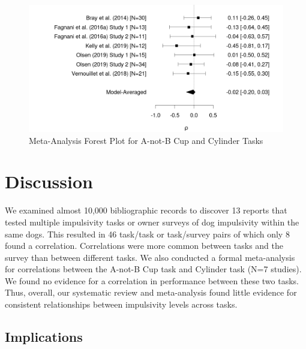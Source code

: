 \documentclass[
  ,pub,floatsintext]{apa6}
\begin{document}
\begin{figure}[h]
\caption{\newline Meta-Analysis Forest Plot for A-not-B Cup and Cylinder Tasks \label{fig:forest}}
\begin{center}
\includegraphics[width=0.8\linewidth]{"figures/anotb-cylinder-forestplot.png"}
\end{center}


\end{figure}

\hypertarget{discussion}{%
\section{Discussion}\label{discussion}}

We examined almost 10,000 bibliographic records to discover 13 reports that tested multiple impulsivity tasks or owner surveys of dog impulsivity within the same dogs. This resulted in 46 task/task or task/survey pairs of which only 8 found a correlation. Correlations were more common between tasks and the survey than between different tasks. We also conducted a formal meta-analysis for correlations between the A-not-B Cup task and Cylinder task (N=7 studies). We found no evidence for a correlation in performance between these two tasks. Thus, overall, our systematic review and meta-analysis found little evidence for consistent relationships between impulsivity levels across tasks.

\hypertarget{implications}{%
\subsection{Implications}\label{implications}}
\end{document}
